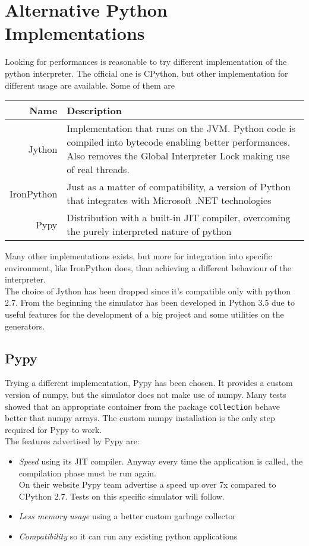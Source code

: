 \section{Alternative Python Implementations}
Looking for performances is reasonable to try different implementation of the
python interpreter. The official one is CPython, but other implementation for
different usage are available. Some of them are
\vspace{0.5cm} \\
\begin{tabular}{r | p{}}
    \textbf{Name} & \textbf{Description} \\\hline
    Jython & Implementation that runs on the JVM. Python code is compiled into
    bytecode enabling better performances. Also removes the Global Interpreter Lock
    making use of real threads.\\\hline
    IronPython & Just as a matter of compatibility, a version of Python that
    integrates with Microsoft .NET technologies\\\hline
    Pypy & Distribution with a built-in JIT compiler, overcoming the purely
    interpreted nature of python\\
\end{tabular}
\vspace{0.5cm}

Many other implementations exists, but more for integration into specific
environment, like IronPython does, than achieving a different behaviour of the
interpreter. \\
The choice of Jython has been dropped since it's compatible only with python
2.7. From the beginning the simulator has been developed in Python 3.5 due to
useful features for the development of a big project and some utilities on the
generators.

\subsection{Pypy}
Trying a different implementation, Pypy has been chosen. It provides a custom
version of numpy, but the simulator does not make use of numpy. Many tests
showed that an appropriate container from the package \texttt{collection}
behave better that numpy arrays. The custom numpy installation is the only step
required for Pypy to work.\\
The features advertised by Pypy are:
\begin{itemize}
    \item \textit{Speed} using its JIT compiler. Anyway every time the
        application is called, the compilation phase must be run again. \\
        On their website Pypy team advertise a speed up over 7x compared to
        CPython 2.7. Tests on this specific simulator will follow.
    \item \textit{Less memory usage} using a better custom garbage collector
    \item \textit{Compatibility} so it can run any existing python applications
\end{itemize}

